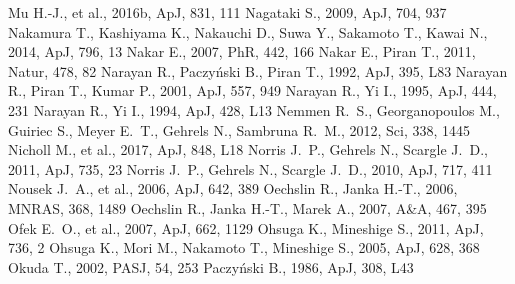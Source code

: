 \documentclass[a4paper,fleqn,usenatbib]{mnras}
\begin{document}
\begin{thebibliography}{207}
 Mu H.-J., et al., 2016b, ApJ, 831, 111
 Nagataki S., 2009, ApJ, 704, 937
 Nakamura T., Kashiyama K., Nakauchi D., Suwa Y., Sakamoto T., Kawai N., 2014, ApJ, 796, 13
 Nakar E., 2007, PhR, 442, 166
 Nakar E., Piran T., 2011, Natur, 478, 82
 Narayan R., Paczy\'nski B., Piran T., 1992, ApJ, 395, L83
 Narayan R., Piran T., Kumar P., 2001, ApJ, 557, 949
 Narayan R., Yi I., 1995, ApJ, 444, 231
 Narayan R., Yi I., 1994, ApJ, 428, L13
 Nemmen R.~S., Georganopoulos M., Guiriec S., Meyer E.~T., Gehrels N., Sambruna R.~M., 2012, Sci, 338, 1445
 Nicholl M., et al., 2017, ApJ, 848, L18
 Norris J.~P., Gehrels N., Scargle J.~D., 2011, ApJ, 735, 23
 Norris J.~P., Gehrels N., Scargle J.~D., 2010, ApJ, 717, 411
 Nousek J.~A., et al., 2006, ApJ, 642, 389
 Oechslin R., Janka H.-T., 2006, MNRAS, 368, 1489
 Oechslin R., Janka H.-T., Marek A., 2007, A\&A, 467, 395
 Ofek E.~O., et al., 2007, ApJ, 662, 1129
 Ohsuga K., Mineshige S., 2011, ApJ, 736, 2
 Ohsuga K., Mori M., Nakamoto T., Mineshige S., 2005, ApJ, 628, 368
 Okuda T., 2002, PASJ, 54, 253
 Paczy\'nski B., 1986, ApJ, 308, L43

\end{thebibliography}
\end{document}

